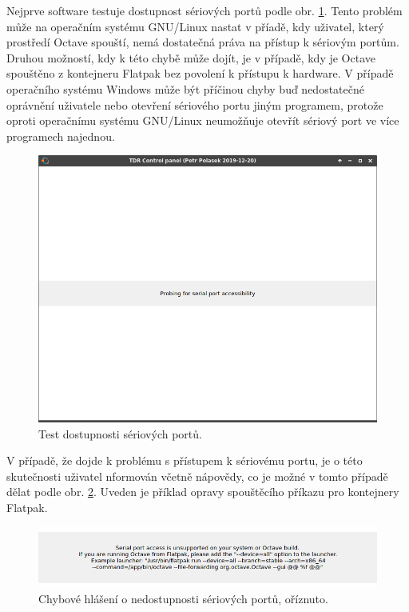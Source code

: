 Nejprve software testuje dostupnost sériových portů podle obr. \ref{serial_probe}. Tento problém může na operačním systému GNU/Linux nastat v příadě, kdy uživatel, který prostředí Octave spouští, nemá dostatečná práva na přístup k sériovým portům. Druhou možností, kdy k této chybě může dojít, je v případě, kdy je Octave spouštěno z kontejneru Flatpak bez povolení k přístupu k hardware. V případě operačního systému Windows může být příčinou chyby buď nedostatečné oprávnění uživatele nebo otevření sériového portu jiným programem, protože oproti operačnímu systému GNU/Linux neumožňuje otevřít sériový port ve více programech najednou.
\begin{figure}[H]
\includegraphics[width=\textwidth,keepaspectratio]{images/gui/serial_probe.png}\caption{Test dostupnosti sériových portů.}\label{serial_probe}
\end{figure}	

V případě, že dojde k problému s přístupem k sériovému portu, je o této skutečnosti uživatel nformován včetně nápovědy, co je možné v tomto případě dělat podle obr. \ref{serial_port_unsupported}. Uveden je příklad opravy spouštěcího příkazu pro kontejnery Flatpak.
\begin{figure}[H]
\includegraphics[width=\textwidth,keepaspectratio]{images/gui/serial_port_unsupported_cut.png}\caption{Chybové hlášení o nedostupnosti sériových portů, oříznuto.}\label{serial_port_unsupported}
\end{figure}	

